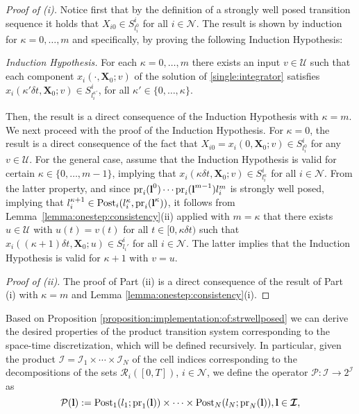 \documentclass[reqno]{amsart}
\theoremstyle{plain}
\theoremstyle{definition}
\numberwithin{equation}{section}
\begin{document}
\begin{proof}[Proof of (i)]
Notice first that by the definition of a strongly well posed transition sequence it holds that $X_{i0}\in S_{l_i^0}^i$ for all $i\in{\ensuremath{\mathcal{N}}}$. The result is shown by induction for $\kappa=0,\ldots,m$ and specifically, by proving the following Induction Hypothesis:

\noindent \textit{Induction Hypothesis.} For each $\kappa=0,\ldots,m$ there exists an input $v\in{\ensuremath{\mathcal{U}}}$ such that each component $x_i(\cdot,{\textbf{{X}}}_0;v)$ of the solution of \eqref{single:integrator} satisfies $x_i(\kappa'\delta t,{\textbf{{X}}}_0;v)\in S^i_{l_i^{\kappa'}}$, for all $\kappa'\in\{0,\ldots,\kappa\}$.

\noindent Then, the result is a direct consequence of the Induction Hypothesis with $\kappa=m$. We next proceed with the proof of the Induction Hypothesis. For $\kappa=0$, the result is a direct consequence of the fact that $X_{i0}=x_i(0,{\textbf{{X}}}_0;v)\in S_{l_i^0}^i$ for any $v\in{\ensuremath{\mathcal{U}}}$. For the general case, assume that the Induction Hypothesis is valid for certain $\kappa\in\{0,\ldots,m-1\}$, implying that $x_i(\kappa\delta t,{\textbf{{X}}}_0;v)\in S^i_{l_i^{\kappa}}$ for all $i\in{\ensuremath{\mathcal{N}}}$. From the latter property, and since  ${\rm pr}_i({\textbf{{l}}}^0)\cdots{\rm pr}_i({\textbf{{l}}}^{m-1})l^m_i$ is strongly well posed, implying that $l_i^{\kappa+1}\in {\rm Post}_i(l_i^{\kappa},{\rm pr}_i({\textbf{{l}}}^{\kappa}))$, it follows from Lemma~\ref{lemma:onestep:consistency}(ii) applied with $m=\kappa$ that there exists $u\in{\ensuremath{\mathcal{U}}}$ with $u(t)=v(t)$ for all $t\in[0,\kappa\delta t)$ such that $x_i((\kappa+1)\delta t,{\textbf{{X}}}_0;u)\in S_{l_i'}^i$ for all $i\in{\ensuremath{\mathcal{N}}}$. The latter implies that the Induction Hypothesis is valid for $\kappa+1$ with $v=u$. 

\noindent \textit{Proof of (ii).} The proof of Part (ii) is a direct consequence of the result of Part (i) with $\kappa=m$ and Lemma \ref{lemma:onestep:consistency}(i).
\end{proof} 

Based on Proposition \ref{proposition:implementation:of:strwellposed} we can derive the desired properties of the product transition system corresponding to the space-time discretization, which will be defined recursively. In particular, given the product ${\ensuremath{\boldsymbol{\mathcal{I}}}}={\ensuremath{\mathcal{I}}}_1\times\cdots\times{\ensuremath{\mathcal{I}}}_N$ of the cell indices corresponding to the decompositions of the sets ${\ensuremath{\mathcal{R}}}_i([0,T])$, $i\in{\ensuremath{\mathcal{N}}}$, we define the operator ${\ensuremath{\mathcal{P}}}:{\ensuremath{\boldsymbol{\mathcal{I}}}}\to 2^{\ensuremath{\boldsymbol{\mathcal{I}}}}$ as  
\begin{equation} \label{post:operator:def}
{\ensuremath{\mathcal{P}}}({\textbf{{l}}}):={\rm Post}_1(l_1;{\rm pr}_1({\textbf{{l}}}))\times\cdots\times {\rm Post}_N(l_N;{\rm pr}_N({\textbf{{l}}})), {\textbf{{l}}}\in{\ensuremath{\boldsymbol{\mathcal{I}}}},
\end{equation}
\end{document}
